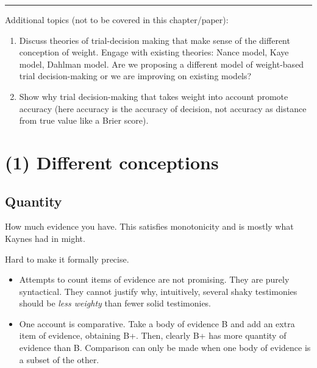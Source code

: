 \documentclass[
  10pt,
  dvipsnames,enabledeprecatedfontcommands]{scrartcl}
\providecommand{\tightlist}{%
  \setlength{\itemsep}{0pt}\setlength{\parskip}{0pt}}
\begin{document}
\begin{center}\rule{0.5\linewidth}{0.5pt}\end{center}

Additional topics (not to be covered in this chapter/paper):

\begin{enumerate}
\def\labelenumi{(\arabic{enumi})}
\setcounter{enumi}{3}
\item
  Discuss theories of trial-decision making that make sense of the
  different conception of weight. Engage with existing theories: Nance
  model, Kaye model, Dahlman model. Are we proposing a different model
  of weight-based trial decision-making or we are improving on existing
  models?
\item
  Show why trial decision-making that takes weight into account promote
  accuracy (here accuracy is the accuracy of decision, not accuracy as
  distance from true value like a Brier score).
\end{enumerate}

\hypertarget{different-conceptions}{%
\section{(1) Different conceptions}\label{different-conceptions}}

\hypertarget{quantity}{%
\subsection{Quantity}\label{quantity}}

How much evidence you have. This satisfies monotonicity and is mostly
what Kaynes had in might.

Hard to make it formally precise.

\begin{itemize}
\tightlist
\item
  Attempts to count items of evidence are not promising. They are purely
  syntactical. They cannot justify why, intuitively, several shaky
  testimonies should be \emph{less weighty} than fewer solid
  testimonies.
\end{itemize}


\begin{itemize}
\tightlist
\item
  One account is comparative. Take a body of evidence B and add an extra
  item of evidence, obtaining B+. Then, clearly B+ has more quantity of
  evidence than B. Comparison can only be made when one body of evidence
  is a subset of the other.
\end{itemize}
\end{document}
